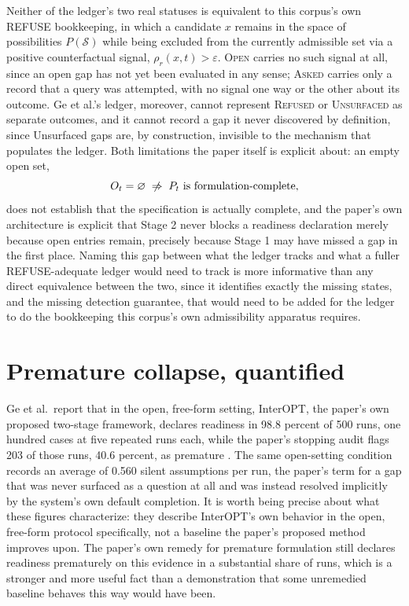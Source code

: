 \documentclass[11pt]{article}
\begin{document}
Neither of the ledger's two real statuses is equivalent to this corpus's own REFUSE bookkeeping, in which a candidate $x$ remains in the space of possibilities $P(\mathcal{S})$ while being excluded from the currently admissible set via a positive counterfactual signal, $\rho_r(x,t) > \varepsilon$. \textsc{Open} carries no such signal at all, since an open gap has not yet been evaluated in any sense; \textsc{Asked} carries only a record that a query was attempted, with no signal one way or the other about its outcome. Ge et al.'s ledger, moreover, cannot represent \textsc{Refused} or \textsc{Unsurfaced} as separate outcomes, and it cannot record a gap it never discovered by definition, since Unsurfaced gaps are, by construction, invisible to the mechanism that populates the ledger. Both limitations the paper itself is explicit about: an empty open set,
$$O_t = \varnothing \;\centernot\Rightarrow\; P_t \text{ is formulation-complete},$$
does not establish that the specification is actually complete, and the paper's own architecture is explicit that Stage 2 never blocks a readiness declaration merely because open entries remain, precisely because Stage 1 may have missed a gap in the first place. Naming this gap between what the ledger tracks and what a fuller REFUSE-adequate ledger would need to track is more informative than any direct equivalence between the two, since it identifies exactly the missing states, and the missing detection guarantee, that would need to be added for the ledger to do the bookkeeping this corpus's own admissibility apparatus requires.

\section{Premature collapse, quantified}

Ge et al.\ report that in the open, free-form setting, InterOPT, the paper's own proposed two-stage framework, declares readiness in 98.8 percent of 500 runs, one hundred cases at five repeated runs each, while the paper's stopping audit flags 203 of those runs, 40.6 percent, as premature \cite{ge2026ask}. The same open-setting condition records an average of 0.560 silent assumptions per run, the paper's term for a gap that was never surfaced as a question at all and was instead resolved implicitly by the system's own default completion. It is worth being precise about what these figures characterize: they describe InterOPT's own behavior in the open, free-form protocol specifically, not a baseline the paper's proposed method improves upon. The paper's own remedy for premature formulation still declares readiness prematurely on this evidence in a substantial share of runs, which is a stronger and more useful fact than a demonstration that some unremedied baseline behaves this way would have been.
\end{document}

